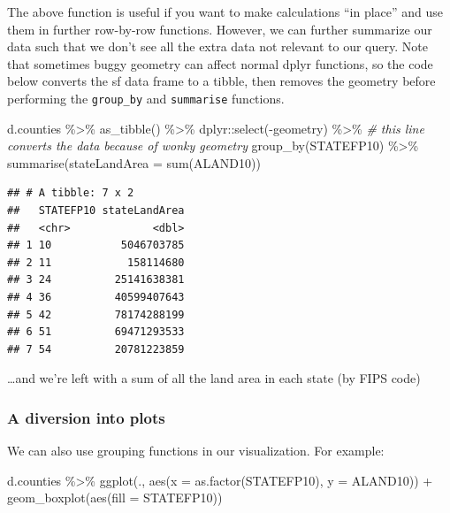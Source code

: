 \documentclass[]{article}
\newenvironment{Shaded}{\begin{snugshade}}{\end{snugshade}}
\newcommand{\AttributeTok}[1]{\textcolor[rgb]{0.77,0.63,0.00}{#1}}
\newcommand{\CommentTok}[1]{\textcolor[rgb]{0.56,0.35,0.01}{\textit{#1}}}
\newcommand{\FunctionTok}[1]{\textcolor[rgb]{0.00,0.00,0.00}{#1}}
\newcommand{\NormalTok}[1]{#1}
\newcommand{\SpecialCharTok}[1]{\textcolor[rgb]{0.00,0.00,0.00}{#1}}
\begin{document}
The above function is useful if you want to make calculations ``in
place'' and use them in further row-by-row functions. However, we can
further summarize our data such that we don't see all the extra data not
relevant to our query. Note that sometimes buggy geometry can affect
normal dplyr functions, so the code below converts the sf data frame to
a tibble, then removes the geometry before performing the
\texttt{group\_by} and \texttt{summarise} functions.

\begin{Shaded}
\begin{Highlighting}[]
\NormalTok{d.counties }\SpecialCharTok{\%\textgreater{}\%} 
  \FunctionTok{as\_tibble}\NormalTok{() }\SpecialCharTok{\%\textgreater{}\%}\NormalTok{ dplyr}\SpecialCharTok{::}\FunctionTok{select}\NormalTok{(}\SpecialCharTok{{-}}\NormalTok{geometry) }\SpecialCharTok{\%\textgreater{}\%} \CommentTok{\# this line converts the data because of wonky geometry}
  \FunctionTok{group\_by}\NormalTok{(STATEFP10) }\SpecialCharTok{\%\textgreater{}\%} 
  \FunctionTok{summarise}\NormalTok{(}\AttributeTok{stateLandArea =} \FunctionTok{sum}\NormalTok{(ALAND10))}
\end{Highlighting}
\end{Shaded}

\begin{verbatim}
## # A tibble: 7 x 2
##   STATEFP10 stateLandArea
##   <chr>             <dbl>
## 1 10           5046703785
## 2 11            158114680
## 3 24          25141638381
## 4 36          40599407643
## 5 42          78174288199
## 6 51          69471293533
## 7 54          20781223859
\end{verbatim}

\ldots and we're left with a sum of all the land area in each state (by
FIPS code)

\hypertarget{a-diversion-into-plots}{%
\subsubsection{A diversion into plots}\label{a-diversion-into-plots}}

We can also use grouping functions in our visualization. For example:

\begin{Shaded}
\begin{Highlighting}[]
\NormalTok{d.counties }\SpecialCharTok{\%\textgreater{}\%} 
  \FunctionTok{ggplot}\NormalTok{(., }\FunctionTok{aes}\NormalTok{(}\AttributeTok{x =} \FunctionTok{as.factor}\NormalTok{(STATEFP10), }\AttributeTok{y =}\NormalTok{ ALAND10)) }\SpecialCharTok{+}
  \FunctionTok{geom\_boxplot}\NormalTok{(}\FunctionTok{aes}\NormalTok{(}\AttributeTok{fill =}\NormalTok{ STATEFP10))}
\end{Highlighting}
\end{Shaded}
\end{document}
